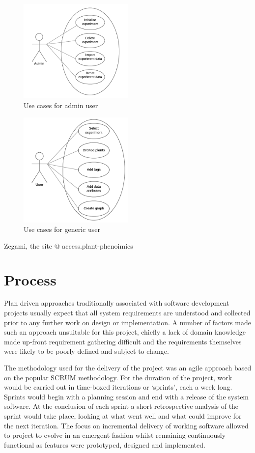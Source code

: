 \begin{figure}[H]
    \centering
    \includegraphics[width=0.5\textwidth]{images/analysis/admin_case}
    \caption{Use cases for admin user}
    \label{fig:admin_case}
\end{figure}
\begin{figure}[H]
    \centering
    \includegraphics[width=0.5\textwidth]{images/analysis/user_case}
    \caption{Use cases for generic user}
    \label{fig:user_case}
\end{figure}

Zegami, the site @ access.plant-phenoimics
\section{Process}

Plan driven approaches traditionally associated with software development projects usually expect that all system requirements are understood and collected prior to any further work on design or implementation. A number of factors made such an approach unsuitable for this project, chiefly a lack of domain knowledge made up-front requirement gathering difficult and the requirements themselves were likely to be poorly defined and subject to change. 

The methodology used for the delivery of the project was an agile approach based on the popular SCRUM methodology. For the duration of the project, work would be carried out in time-boxed iterations or `sprints', each a week long. Sprints would begin with a planning session and end with a release of the system software. At the conclusion of each sprint a short retrospective analysis of the sprint would take place, looking at what went well and what could improve for the next iteration. The focus on incremental delivery of working software allowed to project to evolve in an emergent fashion whilst remaining continuously functional as features were prototyped, designed and implemented.  

